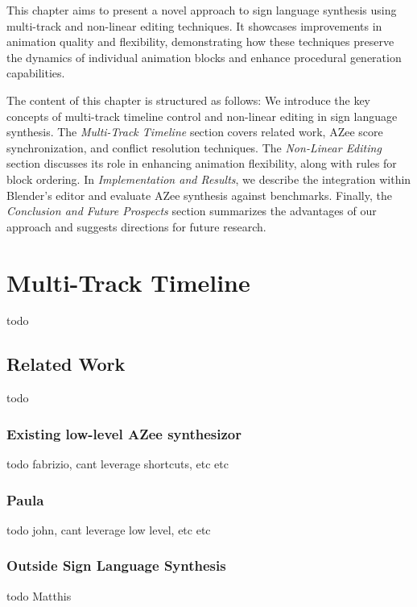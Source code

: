 \documentclass[../../main.tex]{subfiles}
\begin{document}
This chapter aims to present a novel approach to sign language synthesis using multi-track and non-linear editing techniques. It showcases improvements in animation quality and flexibility, demonstrating how these techniques preserve the dynamics of individual animation blocks and enhance procedural generation capabilities.

The content of this chapter is structured as follows: We introduce the key concepts of multi-track timeline control and non-linear editing in sign language synthesis. The \emph{Multi-Track Timeline} section covers related work, AZee score synchronization, and conflict resolution techniques. The \emph{Non-Linear Editing} section discusses its role in enhancing animation flexibility, along with rules for block ordering. In \emph{Implementation and Results}, we describe the integration within Blender’s editor and evaluate AZee synthesis against benchmarks. Finally, the \emph{Conclusion and Future Prospects} section summarizes the advantages of our approach and suggests directions for future research.

\section{Multi-Track Timeline}

todo

\subsection{Related Work}

todo

\subsubsection{Existing low-level AZee synthesizor}

todo fabrizio, cant leverage shortcuts, etc etc

\subsubsection{Paula}

todo john, cant leverage low level, etc etc

\subsubsection{Outside Sign Language Synthesis}

todo Matthis
\end{document}
